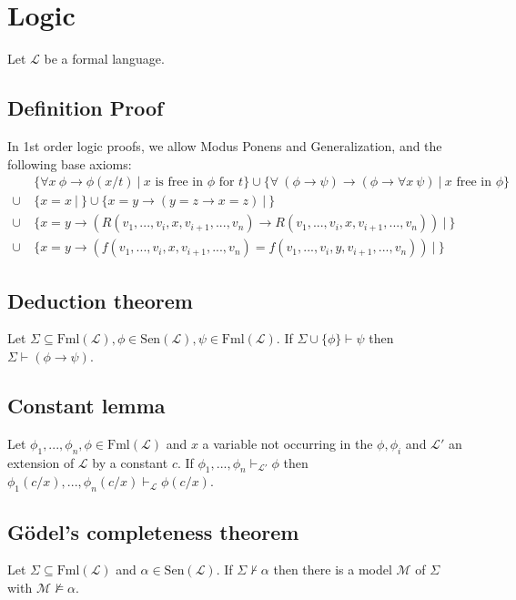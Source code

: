 \documentclass{scrartcl}
\begin{document}
\section{Logic}

Let $\mathcal{L}$ be a formal language.

\subsection*{Definition Proof}
In 1st order logic proofs, we allow Modus Ponens and Generalization, and the following base axioms:
\begin{align*}
    &\{ \forall x \ \phi \rightarrow \phi(x/t) \ | \ \text{$x$ is free in $\phi$ for $t$} \} \cup \{ \forall \ (\phi \rightarrow \psi) \rightarrow (\phi \rightarrow \forall x \ \psi) \ | \ \text{$x$ free in $\phi$}\} \\
    \cup \ & \{ x = x \ | \ \} \cup \{x = y \rightarrow (y = z \rightarrow x = z) \ | \ \} \\
    \cup \ & \{ x = y \rightarrow (R(v_1, ..., v_i, x, v_{i + 1}, ..., v_n) \rightarrow R(v_1, ..., v_i, x, v_{i + 1}, ..., v_n)) \ | \ \} \\
    \cup \ & \{ x = y \rightarrow (f(v_1, ..., v_i, x, v_{i + 1}, ..., v_n) = f(v_1, ..., v_i, y, v_{i + 1}, ..., v_n)) \ | \ \}
\end{align*}

\subsection{Deduction theorem}
Let $\Sigma \subseteq \mathrm{Fml}(\mathcal{L}), \phi \in \mathrm{Sen}(\mathcal{L}), \psi \in \mathrm{Fml}(\mathcal{L})$. If $\Sigma \cup \{\phi\} \vdash \psi$ then $\Sigma \vdash (\phi \rightarrow \psi)$.

\subsection{Constant lemma}
Let $\phi_1, ..., \phi_n, \phi \in \mathrm{Fml}(\mathcal{L})$ and $x$ a variable not occurring in the $\phi, \phi_i$ and $\mathcal{L}'$ an extension of $\mathcal{L}$ by a constant $c$. If $\phi_1, ..., \phi_n \vdash_{\mathcal{L}'} \phi$ then $\phi_1(c/x), ..., \phi_n(c/x) \vdash_{\mathcal{L}} \phi(c/x)$.

\subsection{Gödel's completeness theorem}
\label{goedel_completeness}
Let $\Sigma \subseteq \mathrm{Fml}(\mathcal{L})$ and $\alpha \in \mathrm{Sen}(\mathcal{L})$. If $\Sigma \not\vdash \alpha$ then there is a model $\mathcal{M}$ of $\Sigma$ with $\mathcal{M} \not\models \alpha$.
\end{document}
